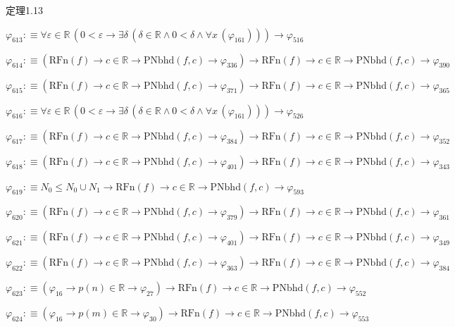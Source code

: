 \begin{fullproof}{定理1.13}
\begin{abbrevlist}
\item $\varphi_{613} :\equiv \forall \varepsilon \in \mathbb{R}\,(0 < \varepsilon \to \exists \delta\,(\delta \in \mathbb{R} \land 0 < \delta \land \forall x\,(\varphi_{161}))) \to \varphi_{516}$
\item $\varphi_{614} :\equiv (\mathrm{RFn}(f) \to c \in \mathbb{R} \to \mathrm{PNbhd}(f,c) \to \varphi_{336}) \to \mathrm{RFn}(f) \to c \in \mathbb{R} \to \mathrm{PNbhd}(f,c) \to \varphi_{390}$
\item $\varphi_{615} :\equiv (\mathrm{RFn}(f) \to c \in \mathbb{R} \to \mathrm{PNbhd}(f,c) \to \varphi_{371}) \to \mathrm{RFn}(f) \to c \in \mathbb{R} \to \mathrm{PNbhd}(f,c) \to \varphi_{365}$
\item $\varphi_{616} :\equiv \forall \varepsilon \in \mathbb{R}\,(0 < \varepsilon \to \exists \delta\,(\delta \in \mathbb{R} \land 0 < \delta \land \forall x\,(\varphi_{161}))) \to \varphi_{526}$
\item $\varphi_{617} :\equiv (\mathrm{RFn}(f) \to c \in \mathbb{R} \to \mathrm{PNbhd}(f,c) \to \varphi_{384}) \to \mathrm{RFn}(f) \to c \in \mathbb{R} \to \mathrm{PNbhd}(f,c) \to \varphi_{352}$
\item $\varphi_{618} :\equiv (\mathrm{RFn}(f) \to c \in \mathbb{R} \to \mathrm{PNbhd}(f,c) \to \varphi_{401}) \to \mathrm{RFn}(f) \to c \in \mathbb{R} \to \mathrm{PNbhd}(f,c) \to \varphi_{343}$
\item $\varphi_{619} :\equiv N_{0} \leq N_{0} \cup N_{1} \to \mathrm{RFn}(f) \to c \in \mathbb{R} \to \mathrm{PNbhd}(f,c) \to \varphi_{593}$
\item $\varphi_{620} :\equiv (\mathrm{RFn}(f) \to c \in \mathbb{R} \to \mathrm{PNbhd}(f,c) \to \varphi_{379}) \to \mathrm{RFn}(f) \to c \in \mathbb{R} \to \mathrm{PNbhd}(f,c) \to \varphi_{361}$
\item $\varphi_{621} :\equiv (\mathrm{RFn}(f) \to c \in \mathbb{R} \to \mathrm{PNbhd}(f,c) \to \varphi_{401}) \to \mathrm{RFn}(f) \to c \in \mathbb{R} \to \mathrm{PNbhd}(f,c) \to \varphi_{349}$
\item $\varphi_{622} :\equiv (\mathrm{RFn}(f) \to c \in \mathbb{R} \to \mathrm{PNbhd}(f,c) \to \varphi_{363}) \to \mathrm{RFn}(f) \to c \in \mathbb{R} \to \mathrm{PNbhd}(f,c) \to \varphi_{384}$
\item $\varphi_{623} :\equiv (\varphi_{16} \to p(n) \in \mathbb{R} \to \varphi_{27}) \to \mathrm{RFn}(f) \to c \in \mathbb{R} \to \mathrm{PNbhd}(f,c) \to \varphi_{552}$
\item $\varphi_{624} :\equiv (\varphi_{16} \to p(m) \in \mathbb{R} \to \varphi_{30}) \to \mathrm{RFn}(f) \to c \in \mathbb{R} \to \mathrm{PNbhd}(f,c) \to \varphi_{553}$

\end{abbrevlist}
\end{fullproof}
